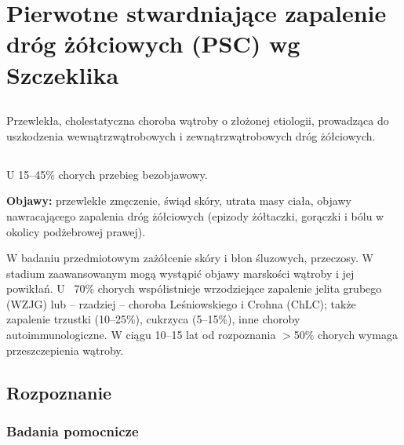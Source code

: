 
\chapter{Pierwotne stwardniające zapalenie dróg żółciowych (PSC) wg Szczeklika}

\section{\DiEtp}

Przewlekła, cholestatyczna choroba wątroby o złożonej etiologii, prowadząca do uszkodzenia wewnątrzwątrobowych i zewnątrzwątrobowych dróg żółciowych.


\section{\ObriP}

U 15–45\% chorych przebieg bezobjawowy. 

\textbf{Objawy:} przewlekłe zmęczenie, świąd skóry, utrata masy ciała, objawy nawracającego zapalenia dróg żółciowych (epizody żółtaczki, gorączki i bólu w okolicy podżebrowej prawej).

W badaniu przedmiotowym zażółcenie skóry i błon śluzowych, przeczosy. 
W stadium zaawansowanym mogą wystąpić objawy marskości wątroby i jej powikłań. 
U ~70\% chorych współistnieje wrzodziejące zapalenie jelita grubego (WZJG) lub – rzadziej – choroba Leśniowskiego i Crohna (ChLC); także zapalenie trzustki (10–25\%), cukrzyca (5–15\%), inne choroby autoimmunologiczne. 
W ciągu 10–15 lat od rozpoznania $>$50\% chorych wymaga przeszczepienia wątroby.

\section{Rozpoznanie}

\subsection{Badania pomocnicze}

